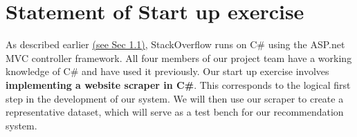 \documentclass{sig-alternate-05-2015}
\begin{document}

\section {Statement of Start up exercise}
\label{start}
As described earlier \hyperref[this]{(see Sec 1.1)}, StackOverflow runs on C\# using the ASP.net MVC controller framework. All four members of our project team have a working knowledge of C\# and have used it previously. Our start up exercise involves \textbf{implementing a website scraper in C\#}. This corresponds to the logical first step in the development of our system. We will then use our scraper to create a representative dataset, which will serve as a test bench for our recommendation system. 
  
\end{document}
